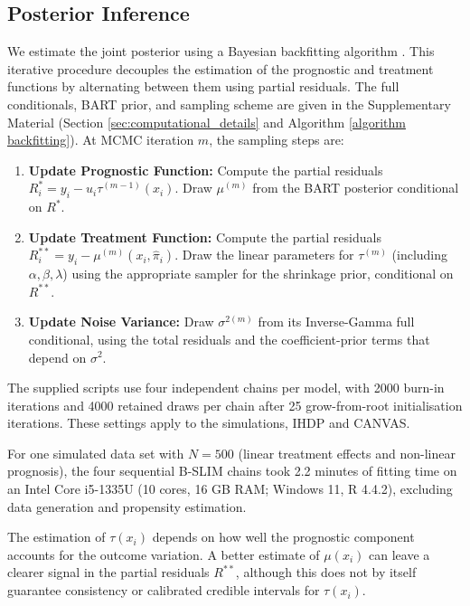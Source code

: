 \documentclass[12pt]{article}
\begin{document}
\subsection{Posterior Inference}
We estimate the joint posterior using a Bayesian backfitting algorithm \citep{hastie2000bayesian}. This iterative procedure decouples the estimation of the prognostic and treatment functions by alternating between them using partial residuals. The full conditionals, BART prior, and sampling scheme are given in the Supplementary Material (Section \ref{sec:computational_details} and Algorithm \ref{algorithm backfitting}). At MCMC iteration $m$, the sampling steps are:

\begin{enumerate}
    \item \textbf{Update Prognostic Function:} Compute the partial residuals $R^*_{i} = y_i - u_i \tau^{(m-1)}(x_i)$. Draw $\mu^{(m)}$ from the BART posterior conditional on $R^*$.
    \item \textbf{Update Treatment Function:} Compute the partial residuals $R^{**}_{i} = y_i - \mu^{(m)}(x_i, \hat{\pi}_i)$. Draw the linear parameters for $\tau^{(m)}$ (including $\alpha, \beta, \lambda$) using the appropriate sampler for the shrinkage prior, conditional on $R^{**}$.
    \item \textbf{Update Noise Variance:} Draw $\sigma^{2(m)}$ from its Inverse-Gamma full conditional, using the total residuals and the coefficient-prior terms that depend on $\sigma^2$.
\end{enumerate}

The supplied scripts use four independent chains per model, with 2000 burn-in iterations and 4000 retained draws per chain after 25 grow-from-root initialisation iterations. These settings apply to the simulations, IHDP and CANVAS.

For one simulated data set with $N=500$ (linear treatment effects and non-linear prognosis), the four sequential B-SLIM chains took 2.2 minutes of fitting time on an Intel Core i5-1335U (10 cores, 16 GB RAM; Windows 11, R 4.4.2), excluding data generation and propensity estimation.

The estimation of $\tau(x_i)$ depends on how well the prognostic component accounts for the outcome variation. A better estimate of $\mu(x_i)$ can leave a clearer signal in the partial residuals $R^{**}$, although this does not by itself guarantee consistency or calibrated credible intervals for $\tau(x_i)$.
\end{document}
